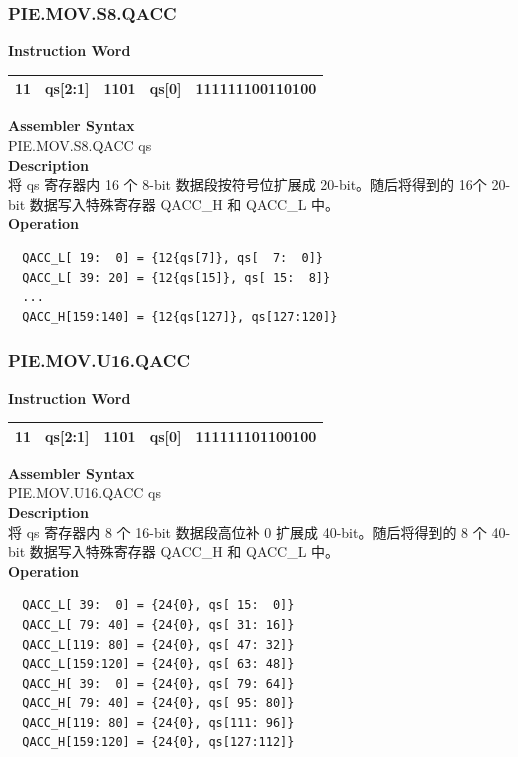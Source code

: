 \newpage
\subsubsection{PIE.MOV.S8.QACC}\label{instruction:PIEMOVS8QACC}
\setlength\tabcolsep{6pt}
\textbf{Instruction Word} \\
\begin{tabular}{|c|c|c|c|c|}
	\hline
	11 & qs[2:1] & 1101 & qs[0] & 111111100110100 \\
	\hline
\end{tabular}

\textbf{Assembler Syntax} \\
PIE.MOV.S8.QACC qs \\
\textbf{Description} \\
将 qs 寄存器内 16 个 8-bit 数据段按符号位扩展成 20-bit。随后将得到的 16个 20-bit 数据写入特殊寄存器 QACC\_H 和 QACC\_L 中。\\
\textbf{Operation}
\begin{lstlisting}
  QACC_L[ 19:  0] = {12{qs[7]}, qs[  7:  0]}
  QACC_L[ 39: 20] = {12{qs[15]}, qs[ 15:  8]}
  ...
  QACC_H[159:140] = {12{qs[127]}, qs[127:120]}
\end{lstlisting}

\newpage
\subsubsection{PIE.MOV.U16.QACC}\label{instruction:PIEMOVU16QACC}
\setlength\tabcolsep{6pt}
\textbf{Instruction Word} \\
\begin{tabular}{|c|c|c|c|c|}
	\hline
	11 & qs[2:1] & 1101 & qs[0] & 111111101100100 \\
	\hline
\end{tabular}

\textbf{Assembler Syntax} \\
PIE.MOV.U16.QACC qs \\
\textbf{Description} \\
将 qs 寄存器内 8 个 16-bit 数据段高位补 0 扩展成 40-bit。随后将得到的 8 个 40-bit 数据写入特殊寄存器 QACC\_H 和 QACC\_L 中。\\
\textbf{Operation}
\begin{lstlisting}
  QACC_L[ 39:  0] = {24{0}, qs[ 15:  0]}
  QACC_L[ 79: 40] = {24{0}, qs[ 31: 16]}
  QACC_L[119: 80] = {24{0}, qs[ 47: 32]}
  QACC_L[159:120] = {24{0}, qs[ 63: 48]}
  QACC_H[ 39:  0] = {24{0}, qs[ 79: 64]}
  QACC_H[ 79: 40] = {24{0}, qs[ 95: 80]}
  QACC_H[119: 80] = {24{0}, qs[111: 96]}
  QACC_H[159:120] = {24{0}, qs[127:112]}
\end{lstlisting}

